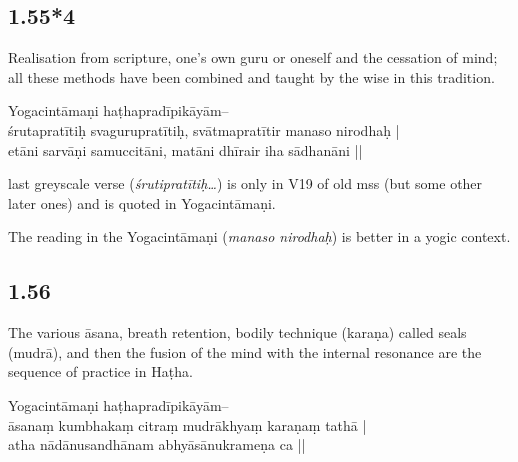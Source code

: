 \begin{ekdosis}
\subsection*{1.55*4}
\begin{translation}[hp01_055_4]
Realisation from scripture, one's own guru or oneself and the cessation of mind; all these methods have been combined and taught by the wise in this tradition.
\end{translation}

\begin{sources}[hp01_055_4]
\end{sources}

\begin{testimonia}[hp01_055_4]
Yogacintāmaṇi
\startverse
haṭhapradīpikāyām--\\
śrutapratītiḥ svagurupratītiḥ, svātmapratītir manaso nirodhaḥ |\\
etāni sarvāṇi samuccitāni, matāni dhīrair iha sādhanāni ||
\endverse
\end{testimonia}

\begin{philcomm}[hp01_055_4]
last greyscale verse (\emph{śrutipratītiḥ…}) is only in V19 of old mss (but some other later ones) and is quoted in Yogacintāmaṇi.

The reading in the Yogacintāmaṇi (\emph{manaso nirodhaḥ}) is better in a yogic context.
\end{philcomm}

\subsection*{1.56}
\begin{translation}[hp01_056]
The various āsana, breath retention, bodily technique (karaṇa) called seals (mudrā), and then the fusion of the mind with the internal resonance are the sequence of practice in Haṭha.
\end{translation}

\begin{sources}[hp01_056]
\end{sources}

\begin{testimonia}[hp01_056]
Yogacintāmaṇi
\startverse
haṭhapradīpikāyām--\\
āsanaṃ kumbhakaṃ citraṃ mudrākhyaṃ karaṇaṃ tathā |\\
atha nādānusandhānam abhyāsānukrameṇa ca ||
\endverse
\end{testimonia}


\end{ekdosis}
